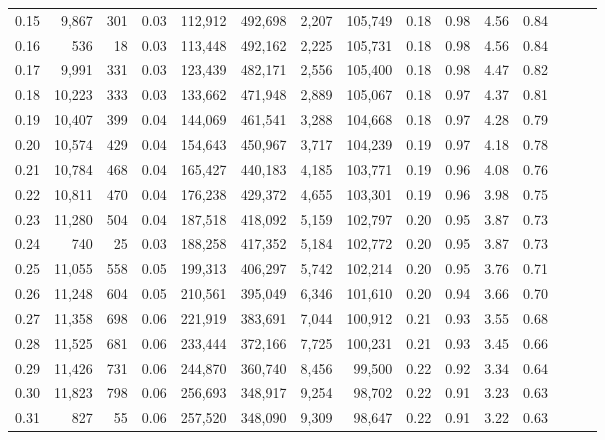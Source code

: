 \begin{tabular}{rrrrrrrrrrrrrrr}
0.15 &   9,867 &    301 &  0.03 &  112,912 &  492,698 &    2,207 &  105,749 &  0.18 &  0.98 &  4.56 &      0.84 \\
0.16 &     536 &     18 &  0.03 &  113,448 &  492,162 &    2,225 &  105,731 &  0.18 &  0.98 &  4.56 &      0.84 \\
0.17 &   9,991 &    331 &  0.03 &  123,439 &  482,171 &    2,556 &  105,400 &  0.18 &  0.98 &  4.47 &      0.82 \\
0.18 &  10,223 &    333 &  0.03 &  133,662 &  471,948 &    2,889 &  105,067 &  0.18 &  0.97 &  4.37 &      0.81 \\
0.19 &  10,407 &    399 &  0.04 &  144,069 &  461,541 &    3,288 &  104,668 &  0.18 &  0.97 &  4.28 &      0.79 \\
0.20 &  10,574 &    429 &  0.04 &  154,643 &  450,967 &    3,717 &  104,239 &  0.19 &  0.97 &  4.18 &      0.78 \\
0.21 &  10,784 &    468 &  0.04 &  165,427 &  440,183 &    4,185 &  103,771 &  0.19 &  0.96 &  4.08 &      0.76 \\
0.22 &  10,811 &    470 &  0.04 &  176,238 &  429,372 &    4,655 &  103,301 &  0.19 &  0.96 &  3.98 &      0.75 \\
0.23 &  11,280 &    504 &  0.04 &  187,518 &  418,092 &    5,159 &  102,797 &  0.20 &  0.95 &  3.87 &      0.73 \\
0.24 &     740 &     25 &  0.03 &  188,258 &  417,352 &    5,184 &  102,772 &  0.20 &  0.95 &  3.87 &      0.73 \\
0.25 &  11,055 &    558 &  0.05 &  199,313 &  406,297 &    5,742 &  102,214 &  0.20 &  0.95 &  3.76 &      0.71 \\
0.26 &  11,248 &    604 &  0.05 &  210,561 &  395,049 &    6,346 &  101,610 &  0.20 &  0.94 &  3.66 &      0.70 \\
0.27 &  11,358 &    698 &  0.06 &  221,919 &  383,691 &    7,044 &  100,912 &  0.21 &  0.93 &  3.55 &      0.68 \\
0.28 &  11,525 &    681 &  0.06 &  233,444 &  372,166 &    7,725 &  100,231 &  0.21 &  0.93 &  3.45 &      0.66 \\
0.29 &  11,426 &    731 &  0.06 &  244,870 &  360,740 &    8,456 &   99,500 &  0.22 &  0.92 &  3.34 &      0.64 \\
0.30 &  11,823 &    798 &  0.06 &  256,693 &  348,917 &    9,254 &   98,702 &  0.22 &  0.91 &  3.23 &      0.63 \\
0.31 &     827 &     55 &  0.06 &  257,520 &  348,090 &    9,309 &   98,647 &  0.22 &  0.91 &  3.22 &      0.63 \\

\end{tabular}
